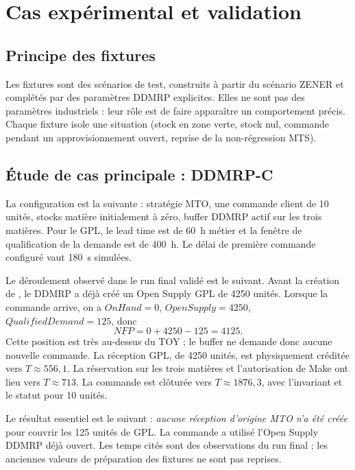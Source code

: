 \chapter{Cas expérimental et validation}\label{ch:cas}

\section{Principe des fixtures}

Les fixtures sont des scénarios de test, construits à partir du scénario ZENER et complétés par des
paramètres DDMRP explicites. Elles ne sont pas des paramètres industriels : leur rôle est de faire
apparaître un comportement précis. Chaque fixture isole une situation (stock en zone verte, stock
nul, commande pendant un approvisionnement ouvert, reprise de la non-régression MTS).

\section{Étude de cas principale : DDMRP-C}

La configuration est la suivante : stratégie MTO, une commande client de 10 unités, stocks matière
initialement à zéro, buffer DDMRP actif sur les trois matières. Pour le GPL, le lead time est de
60~h métier et la fenêtre de qualification de la demande est de 400~h. Le délai de première commande
configuré vaut 180~s simulées.

Le déroulement observé dans le run final validé est le suivant. Avant la création de ,
le DDMRP a déjà créé un Open Supply GPL de 4250 unités. Lorsque la commande arrive, on a
$OnHand = 0$, $OpenSupply = 4250$, $QualifiedDemand = 125$, donc
\[
NFP = 0 + 4250 - 125 = 4125.
\]
Cette position est très au-dessus du TOY ; le buffer ne demande donc aucune nouvelle commande. La
réception GPL, de 4250 unités, est physiquement créditée vers $T \approx 556{,}1$. La réservation
sur les trois matières et l'autorisation de Make ont lieu vers $T \approx 713$. La commande est clôturée
vers $T \approx 1876{,}3$, avec l'invariant  et le statut
 pour 10 unités.

Le résultat essentiel est le suivant : \emph{aucune réception d'origine MTO n'a été créée} pour couvrir
les 125 unités de GPL. La commande a utilisé l'Open Supply DDMRP déjà ouvert. Les temps cités sont des
observations du run final ; les anciennes valeurs de préparation des fixtures ne sont pas reprises.

